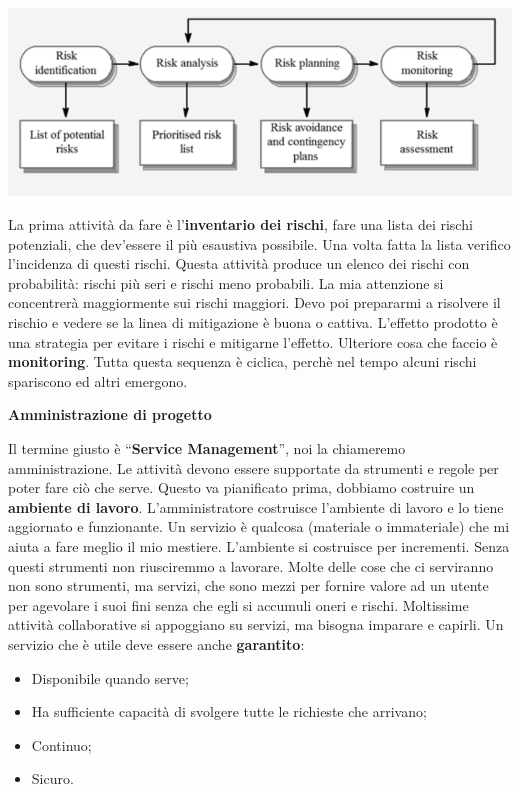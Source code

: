 \begin{center}

\includegraphics[width=0.75\columnwidth]{img1} %

\end{center}

La prima attività da fare è l'\textbf{inventario dei rischi}, fare una lista dei rischi potenziali, che dev'essere il più esaustiva possibile. Una volta fatta la lista verifico l'incidenza di questi rischi. Questa attività produce un elenco dei rischi con probabilità: rischi più seri e rischi meno probabili. La mia attenzione si concentrerà maggiormente sui rischi maggiori. Devo poi prepararmi a risolvere il rischio e vedere se la linea di mitigazione è buona o cattiva. L'effetto prodotto è una strategia per evitare i rischi e mitigarne l'effetto. Ulteriore cosa che faccio è \textbf{monitoring}. Tutta questa sequenza è ciclica, perchè nel tempo alcuni rischi spariscono ed altri emergono.

\textbf{Amministrazione di progetto}

Il termine giusto è ``\textbf{Service Management}'', noi la chiameremo amministrazione. Le attività devono essere supportate da strumenti e regole per poter fare ciò che serve. Questo va pianificato prima, dobbiamo costruire un \textbf{ambiente di lavoro}. L'amministratore costruisce l'ambiente di lavoro e lo tiene aggiornato e funzionante. Un servizio è qualcosa (materiale o immateriale) che mi aiuta a fare meglio il mio mestiere. L'ambiente si costruisce per incrementi. Senza questi strumenti non riusciremmo a lavorare. Molte delle cose che ci serviranno non sono strumenti, ma servizi, che sono mezzi per fornire valore ad un utente per agevolare i suoi fini senza che egli si accumuli oneri e rischi. Moltissime attività collaborative si appoggiano su servizi, ma bisogna imparare e capirli. Un servizio che è utile deve essere anche \textbf{garantito}:

\begin{itemize}

	\item Disponibile quando serve;
	\item Ha sufficiente capacità di svolgere tutte le richieste che arrivano;
	\item Continuo;
	\item Sicuro.

\end{itemize}

